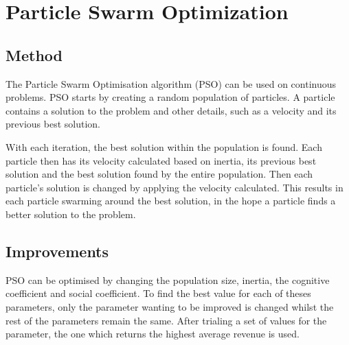 \documentclass{article}
\begin{document}
\section{Particle Swarm Optimization}
\subsection{Method}

The Particle Swarm Optimisation algorithm (PSO) can be used on continuous problems. PSO starts by creating a random population of particles. A particle contains a solution to the problem and other details, such as a velocity and its previous best solution.

With each iteration, the best solution within the population is found. Each particle then has its velocity calculated based on inertia, its previous best solution and the best solution found by the entire population. Then each particle's solution is changed  by applying the velocity calculated. This results in each particle swarming around the best solution, in the hope a particle finds a better solution to the problem.

\subsection{Improvements}

PSO can be optimised by changing the population size, inertia, the cognitive coefficient and social coefficient. To find the best value for each of theses parameters, only the parameter wanting to be improved is changed whilst the rest of the parameters remain the same. After trialing a set of values for the parameter, the one which returns the highest average revenue is used.
\end{document}
